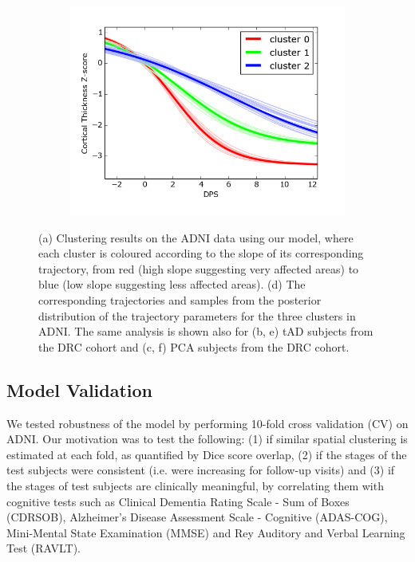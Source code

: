 \documentclass{llncs}
\begin{document}
\begin{figure}[h]
\begin{subfigure}[b]{0.3\textwidth}
      \label{fig:drcTrajAD}
  \end{subfigure}
    \begin{subfigure}[b]{0.3\textwidth}
    \centering
    \includegraphics[width=\scalingFactorTraj\textwidth,trim=0 30 0 0]{figures/trajSamplesOneFig_drcThavgFWHM0InithistCl3Pr0Ra1_VWDPMStdPCA.png}
    \caption{}
      \label{fig:drcTrajPCA}
  \end{subfigure}
  
  \caption{(a) Clustering results on the ADNI data using our model, where each cluster is coloured according to the slope of its corresponding trajectory, from red (high slope suggesting very affected areas) to blue (low slope suggesting less affected areas). (d) The corresponding trajectories and samples from the posterior distribution of the trajectory  parameters for the three clusters in ADNI. The same analysis is shown also for (b, e) tAD subjects from the DRC cohort and (c, f) PCA subjects from the DRC cohort.}
  \label{fig:clustTrajAll}

\end{figure}

\subsection{Model Validation}

We tested robustness of the model by performing 10-fold cross validation (CV) on ADNI. Our motivation was to test the following: (1) if similar spatial clustering is estimated at each fold, as quantified by Dice score overlap, (2) if the stages of the test subjects were consistent (i.e. were increasing for follow-up visits) and (3) if the stages of test subjects are clinically meaningful, by correlating them with cognitive tests such as Clinical Dementia Rating Scale - Sum of Boxes (CDRSOB), Alzheimer's Disease Assessment Scale - Cognitive (ADAS-COG), Mini-Mental State Examination (MMSE) and Rey Auditory and Verbal Learning Test (RAVLT).
\end{document}
